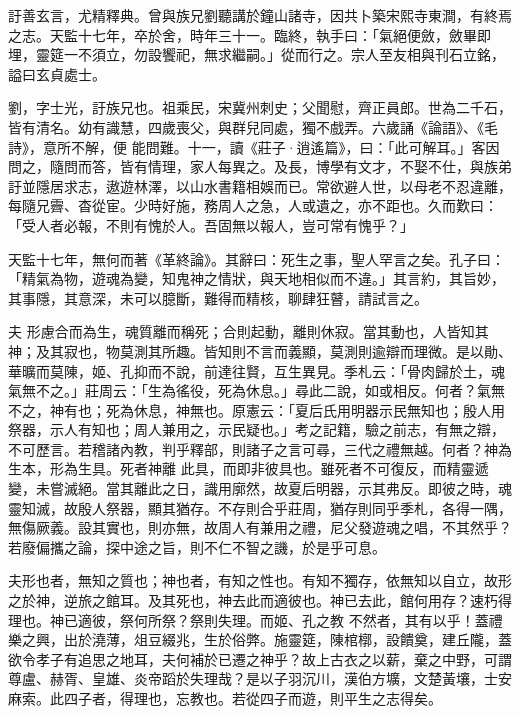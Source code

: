 \begin{pinyinscope}
 訏善玄言，尤精釋典。曾與族兄劉聽講於鐘山諸寺，因共卜築宋熙寺東澗，有終焉之志。天監十七年，卒於舍，時年三十一。臨終，執手曰：「氣絕便斂，斂畢即埋，靈筵一不須立，勿設饗祀，無求繼嗣。」從而行之。宗人至友相與刊石立銘，謚曰玄貞處士。



 劉，字士光，訏族兄也。祖乘民，宋冀州刺史；父聞慰，齊正員郎。世為二千石，皆有清名。幼有識慧，四歲喪父，與群兒同處，獨不戲弄。六歲誦《論語》、《毛詩》，意所不解，便
 能問難。十一，讀《莊子·逍遙篇》，曰：「此可解耳。」客因問之，隨問而答，皆有情理，家人每異之。及長，博學有文才，不娶不仕，與族弟訏並隱居求志，遨遊林澤，以山水書籍相娛而已。常欲避人世，以母老不忍違離，每隨兄霽、杳從宦。少時好施，務周人之急，人或遺之，亦不距也。久而歎曰：「受人者必報，不則有愧於人。吾固無以報人，豈可常有愧乎？」



 天監十七年，無何而著《革終論》。其辭曰：死生之事，聖人罕言之矣。孔子曰：「精氣為物，遊魂為變，知鬼神之情狀，與天地相似而不違。」其言約，其旨妙，其事隱，其意深，未可以臆斷，難得而精核，聊肆狂瞽，請試言之。



 夫
 形慮合而為生，魂質離而稱死；合則起動，離則休寂。當其動也，人皆知其神；及其寂也，物莫測其所趣。皆知則不言而義顯，莫測則逾辯而理微。是以勛、華曠而莫陳，姬、孔抑而不說，前達往賢，互生異見。季札云：「骨肉歸於土，魂氣無不之。」莊周云：「生為徭役，死為休息。」尋此二說，如或相反。何者？氣無不之，神有也；死為休息，神無也。原憲云：「夏后氏用明器示民無知也；殷人用祭器，示人有知也；周人兼用之，示民疑也。」考之記籍，驗之前志，有無之辯，不可歷言。若稽諸內教，判乎釋部，則諸子之言可尋，三代之禮無越。何者？神為生本，形為生具。死者神離
 此具，而即非彼具也。雖死者不可復反，而精靈遞變，未嘗滅絕。當其離此之日，識用廓然，故夏后明器，示其弗反。即彼之時，魂靈知滅，故殷人祭器，顯其猶存。不存則合乎莊周，猶存則同乎季札，各得一隅，無傷厥義。設其實也，則亦無，故周人有兼用之禮，尼父發遊魂之唱，不其然乎？若廢偏攜之論，探中途之旨，則不仁不智之譏，於是乎可息。



 夫形也者，無知之質也；神也者，有知之性也。有知不獨存，依無知以自立，故形之於神，逆旅之館耳。及其死也，神去此而適彼也。神已去此，館何用存？速朽得理也。神已適彼，祭何所祭？祭則失理。而姬、孔之教
 不然者，其有以乎！蓋禮樂之興，出於澆薄，俎豆綴兆，生於俗弊。施靈筵，陳棺槨，設饋奠，建丘隴，蓋欲令孝子有追思之地耳，夫何補於已遷之神乎？故上古衣之以薪，棄之中野，可謂尊盧、赫胥、皇雄、炎帝蹈於失理哉？是以子羽沉川，漢伯方壙，文楚黃壤，士安麻索。此四子者，得理也，忘教也。若從四子而遊，則平生之志得矣。




\end{pinyinscope}
